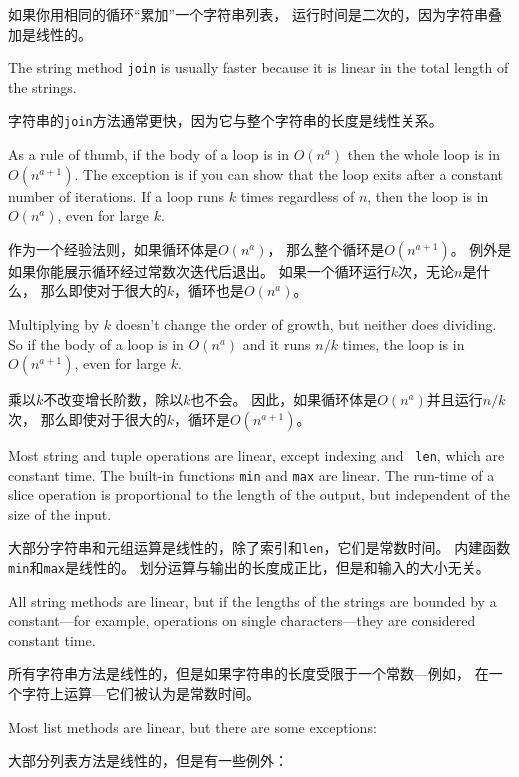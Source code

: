 \documentclass[10pt]{book}
\begin{document}
\begin{CJK}{UTF8}{gbsn}
如果你用相同的循环``累加''一个字符串列表，
运行时间是二次的，因为字符串叠加是线性的。

The string method {\tt join} is usually faster because it is
linear in the total length of the strings.

字符串的{\tt join}方法通常更快，因为它与整个字符串的长度是线性关系。

As a rule of thumb, if the body of a loop is in $O(n^a)$ then
the whole loop is in $O(n^{a+1})$.  The exception is if you can
show that the loop exits after a constant number of iterations.
If a loop runs $k$ times regardless of $n$, then
the loop is in $O(n^a)$, even for large $k$.

作为一个经验法则，如果循环体是$O(n^a)$，
那么整个循环是$O(n^{a+1})$。
例外是如果你能展示循环经过常数次迭代后退出。
如果一个循环运行$k$次，无论$n$是什么，
那么即使对于很大的$k$，循环也是$O(n^a)$。

Multiplying by $k$ doesn't change the order of growth, but neither
does dividing.  So if the body of a loop is in $O(n^a)$ and it runs
$n/k$ times, the loop is in $O(n^{a+1})$, even for large $k$.

乘以$k$不改变增长阶数，除以$k$也不会。
因此，如果循环体是$O(n^a)$并且运行$n/k$次，
那么即使对于很大的$k$，循环是$O(n^{a+1})$。

Most string and tuple operations are linear, except indexing and {\tt
  len}, which are constant time.  The built-in functions {\tt min} and
{\tt max} are linear.  The run-time of a slice operation is
proportional to the length of the output, but independent of the size
of the input.

大部分字符串和元组运算是线性的，除了索引和{\tt len}，它们是常数时间。
内建函数{\tt min}和{\tt max}是线性的。
划分运算与输出的长度成正比，但是和输入的大小无关。

All string methods are linear, but if the lengths of
the strings are bounded by a constant---for example, operations on single
characters---they are considered constant time.

所有字符串方法是线性的，但是如果字符串的长度受限于一个常数---例如，
在一个字符上运算---它们被认为是常数时间。

Most list methods are linear, but there are some exceptions:

大部分列表方法是线性的，但是有一些例外：

\begin{itemize}


\end{itemize}
\end{CJK}
\end{document}
